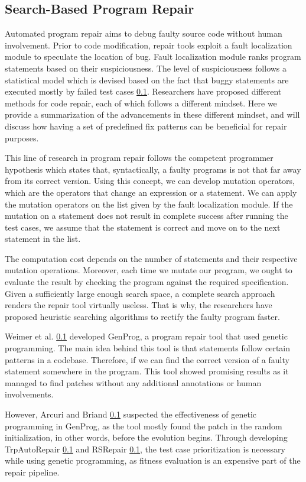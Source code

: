 \subsection{Search-Based Program Repair}

Automated program repair aims to debug faulty source code without human involvement. Prior to code modification, repair tools exploit a fault localization module to speculate the location of bug. Fault localization module ranks program statements based on their suspiciousness. The level of suspiciousness follows a statistical model which is devised based on the fact that buggy statements are executed mostly by failed test cases \ref{}. Researchers have proposed different methods for code repair, each of which follows a different mindset. Here we provide a summarization of the advancements in these different mindset, and will discuss how having a set of predefined fix patterns can be beneficial for repair purposes.

This line of research in program repair follows the competent programmer hypothesis which states that, syntactically, a faulty programs is not that far away from its correct version. Using this concept, we can develop mutation operators, which are the operators that change an expression or a statement. We can apply the mutation operators on the list given by the fault localization module. If the mutation on a statement does not result in complete success after running the test cases, we assume that the statement is correct and move on to the next statement in the list. 

The computation cost depends on the number of statements and their respective mutation operations. Moreover, each time we mutate our program, we ought to evaluate the result by checking the program against the required specification. Given a sufficiently large enough search space, a complete search approach renders the repair tool virtually useless. That is why, the researchers have proposed heuristic searching algorithms to rectify the faulty program faster.

Weimer et al. \ref{} developed GenProg, a program repair tool that used genetic programming. The main idea behind this tool is that statements follow certain patterns in a codebase. Therefore, if we can find the correct version of a faulty statement somewhere in the program. This tool showed promising results as it managed to find patches without any additional annotations or human involvements.

However, Arcuri and Briand \ref{} suspected the effectiveness of genetic programming in GenProg, as the tool mostly found the patch in the random initialization, in other words, before the evolution begins. Through developing TrpAutoRepair \ref{} and RSRepair \ref{}, the test case prioritization is necessary while using genetic programming, as fitness evaluation is an expensive part of the repair pipeline.

